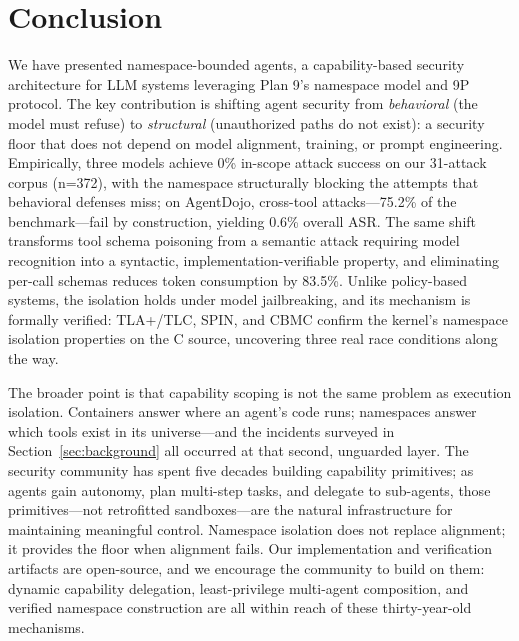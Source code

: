 \documentclass{article}
\begin{document}
\section{Conclusion}
\label{sec:conclusion}

We have presented namespace-bounded agents, a capability-based security architecture for LLM systems leveraging Plan 9's namespace model and 9P protocol. The key contribution is shifting agent security from \textit{behavioral} (the model must refuse) to \textit{structural} (unauthorized paths do not exist): a security floor that does not depend on model alignment, training, or prompt engineering. Empirically, three models achieve 0\% in-scope attack success on our 31-attack corpus (n=372), with the namespace structurally blocking the attempts that behavioral defenses miss; on AgentDojo, cross-tool attacks---75.2\% of the benchmark---fail by construction, yielding 0.6\% overall ASR. The same shift transforms tool schema poisoning from a semantic attack requiring model recognition into a syntactic, implementation-verifiable property, and eliminating per-call schemas reduces token consumption by 83.5\%. Unlike policy-based systems, the isolation holds under model jailbreaking, and its mechanism is formally verified: TLA+/TLC, SPIN, and CBMC confirm the kernel's namespace isolation properties on the C source, uncovering three real race conditions along the way.

The broader point is that capability scoping is not the same problem as execution isolation. Containers answer where an agent's code runs; namespaces answer which tools exist in its universe---and the incidents surveyed in Section~\ref{sec:background} all occurred at that second, unguarded layer. The security community has spent five decades building capability primitives; as agents gain autonomy, plan multi-step tasks, and delegate to sub-agents, those primitives---not retrofitted sandboxes---are the natural infrastructure for maintaining meaningful control. Namespace isolation does not replace alignment; it provides the floor when alignment fails. Our implementation and verification artifacts are open-source, and we encourage the community to build on them: dynamic capability delegation, least-privilege multi-agent composition, and verified namespace construction are all within reach of these thirty-year-old mechanisms.



\end{document}

